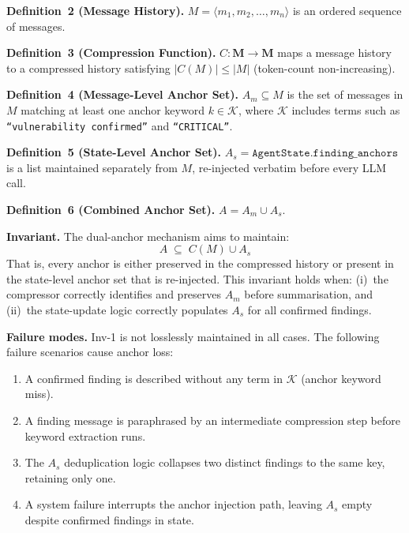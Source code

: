 \documentclass[12pt, a4paper, oneside, openany]{book}
\newcommand{\code}[1]{\texttt{#1}}
\begin{document}
\begin{infobox}
\textbf{Definition~2 (Message History).}  $M = \langle m_1, m_2, \ldots, m_n \rangle$
is an ordered sequence of messages.

\textbf{Definition~3 (Compression Function).}\label{def:compression}
$C: \mathbf{M} \to \mathbf{M}$ maps a message history to a
compressed history satisfying $|C(M)| \leq |M|$ (token-count
non-increasing).

\textbf{Definition~4 (Message-Level Anchor Set).}
$A_m \subseteq M$ is the set of messages in $M$ matching at least
one anchor keyword $k \in \mathcal{K}$, where $\mathcal{K}$ includes
terms such as \texttt{``vulnerability confirmed''} and
\texttt{``CRITICAL''}.

\textbf{Definition~5 (State-Level Anchor Set).}
$A_s = \code{AgentState.finding\_anchors}$ is a list maintained
separately from $M$, re-injected verbatim before every LLM call.

\textbf{Definition~6 (Combined Anchor Set).}
$A = A_m \cup A_s$.
\end{infobox}

\textbf{Invariant.}  The dual-anchor mechanism aims to maintain:
\[
  A \;\subseteq\; C(M) \cup A_s
  \tag{Inv-1}
\]
That is, every anchor is either preserved in the compressed history
or present in the state-level anchor set that is re-injected.  This
invariant holds when: (i)~the compressor correctly identifies and
preserves $A_m$ before summarisation, and (ii)~the state-update logic
correctly populates $A_s$ for all confirmed findings.

\textbf{Failure modes.}  Inv-1 is not losslessly maintained in all
cases.  The following failure scenarios cause anchor loss:

\begin{enumerate}[leftmargin=*]
  \item A confirmed finding is described without any term in
    $\mathcal{K}$ (anchor keyword miss).
  \item A finding message is paraphrased by an intermediate
    compression step before keyword extraction runs.
  \item The $A_s$ deduplication logic collapses two distinct findings
    to the same key, retaining only one.
  \item A system failure interrupts the anchor injection path, leaving
    $A_s$ empty despite confirmed findings in state.
\end{enumerate}
\end{document}
